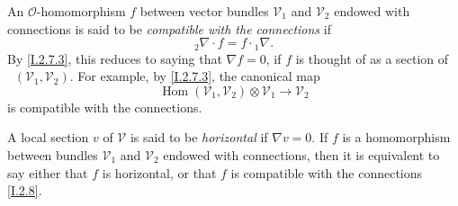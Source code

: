 \documentclass{report}
\theoremstyle{plain}
\theoremstyle{definition}
\newenvironment{env}[1]
    {\renewcommand\theinnercustomenv{#1}\innercustomenv}
    {\endinnercustomenv}
\newcommand{\sh}{\mathscr}
\DeclareMathOperator{\Hom}{Hom}
\DeclareMathOperator{\shHom}{\underline{Hom}}
\newcommand{\oldpage}[1]{\marginpar{\footnotesize$\Big\vert$ \textit{p.~#1}}}
\begin{document}
\begin{env}{2.8}
\label{I.2.8}
  An $\sh{O}$-homomorphism $f$ between vector bundles $\sh{V}_1$ and $\sh{V}_2$ endowed with connections
\oldpage{9}
  is said to be \emph{compatible with the connections} if
  \[
    {}_2\!\nabla\cdot f = f\cdot{}_1\!\nabla.
  \]
  By \cref{I.2.7.3}, this reduces to saying that $\nabla f=0$, if $f$ is thought of as a section of $\shHom(\sh{V}_1,\sh{V}_2)$.
  For example, by \cref{I.2.7.3}, the canonical map
  \[
    \Hom(\sh{V}_1,\sh{V}_2)\otimes\sh{V}_1 \to \sh{V}_2
  \]
  is compatible with the connections.
\end{env}

\begin{env}{2.9}
\label{I.2.9}
  A local section $v$ of $\sh{V}$ is said to be \emph{horizontal} if $\nabla v=0$.
  If $f$ is a homomorphism between bundles $\sh{V}_1$ and $\sh{V}_2$ endowed with connections, then it is equivalent to say either that $f$ is horizontal, or that $f$ is compatible with the connections \cref{I.2.8}.
\end{env}
\end{document}
